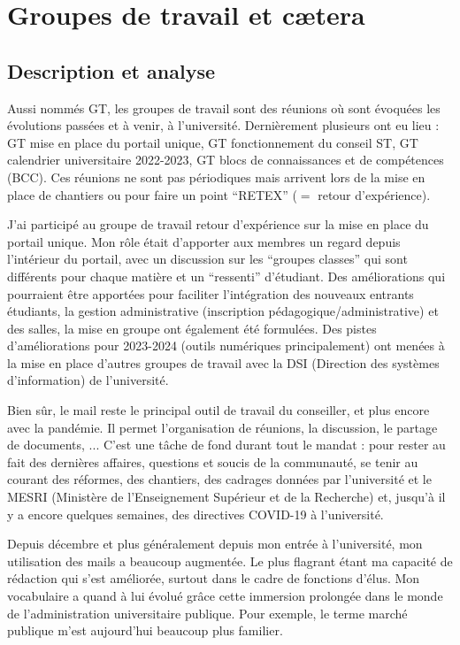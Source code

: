 \documentclass{article}
\begin{document}
\section{Groupes de travail et cætera}

\subsection{Description et analyse}
Aussi nommés GT, les groupes de travail sont des réunions où sont évoquées les évolutions passées et à venir, à l'université. Dernièrement plusieurs ont eu lieu : GT mise en place du portail unique, GT fonctionnement du conseil ST, GT calendrier  universitaire 2022-2023, GT blocs de connaissances et de compétences (BCC). Ces réunions ne sont pas périodiques mais arrivent lors de la mise en place de chantiers ou pour faire un point ``RETEX'' ($=$ retour d'expérience).

J'ai participé au groupe de travail retour d'expérience sur la mise en place du portail unique. Mon rôle était d'apporter aux membres un regard depuis l'intérieur du portail, avec un discussion sur les ``groupes classes'' qui sont différents pour chaque matière et un ``ressenti'' d'étudiant. Des améliorations qui pourraient être apportées pour faciliter l'intégration des nouveaux entrants étudiants, la gestion administrative (inscription pédagogique/administrative) et des salles, la mise en groupe ont également été formulées. Des pistes d'améliorations pour 2023-2024 (outils numériques principalement) ont menées à la mise en place d'autres groupes de travail avec la DSI (Direction des systèmes d’information) de l'université.

Bien sûr, le mail reste le principal outil de travail du conseiller, et plus encore avec la pandémie. Il permet l'organisation de réunions, la discussion, le partage de documents, ... C'est une tâche de fond durant tout le mandat : pour rester au fait des dernières affaires, questions et soucis de la communauté, se tenir au courant des réformes, des chantiers, des cadrages données par l'université et le MESRI (Ministère de l'Enseignement Supérieur et de la Recherche) et, jusqu'à il y a encore quelques semaines, des directives COVID-19 à l'université.

Depuis décembre et plus généralement depuis mon entrée à l'université, mon utilisation des mails a beaucoup augmentée. Le plus flagrant étant ma capacité de rédaction qui s'est améliorée, surtout dans le cadre de fonctions d'élus. Mon vocabulaire a quand à lui évolué grâce cette immersion prolongée dans le monde de l'administration universitaire publique. Pour exemple, le terme marché publique m'est aujourd'hui beaucoup plus familier. 
\end{document}
